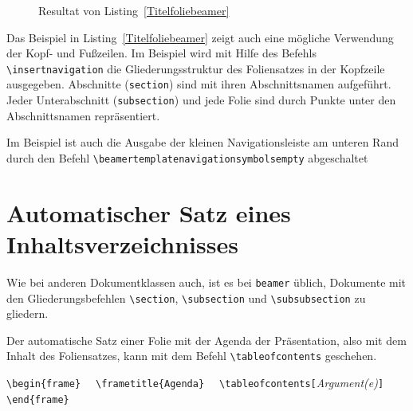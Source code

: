 \documentclass[a4paper,10pt,twoside]{scrbook}
\begin{document}
{\begin{figure}[H]
	\caption{Resultat von Listing~\ref{Titelfoliebeamer}}
	\label{fig_Titelfoliebeamer}
\end{figure}

Das Beispiel in Listing~\ref{Titelfoliebeamer} zeigt auch eine mögliche Verwendung der Kopf- und Fußzeilen. Im Beispiel wird mit Hilfe des Befehls \verb!\insertnavigation! die Gliederungsstruktur des Foliensatzes in der Kopfzeile ausgegeben. Abschnitte (\verb|section|) sind mit ihren Abschnittsnamen aufgeführt. Jeder Unterabschnitt (\verb!subsection!) und jede Folie sind durch Punkte unter den Abschnittsnamen repräsentiert.  

Im Beispiel ist auch die Ausgabe der 
kleinen Navigationsleiste am unteren Rand 
durch den Befehl \verb!\beamertemplatenavigationsymbolsempty!
abgeschaltet 


\section{Automatischer Satz eines Inhaltsverzeichnisses}

Wie bei anderen Dokumentklassen auch, ist es bei \verb|beamer| üblich, Dokumente mit den Gliederungsbefehlen 
\verb|\section|,
\verb|\subsection| und
\verb|\subsubsection| zu gliedern. 

Der automatische Satz einer Folie mit der Agenda der Präsentation, also mit dem Inhalt des Foliensatzes, kann mit dem Befehl 
\verb|\tableofcontents| geschehen.

\begin{boxedminipage}{\textwidth}
	\verb!\begin{frame}!\newline
	\verb!  \frametitle{Agenda}! \newline
	\verb!	\tableofcontents[!\textsl{Argument(e)}\verb|]| \newline
	\verb!\end{frame}!
\end{boxedminipage}

}
\end{document}
